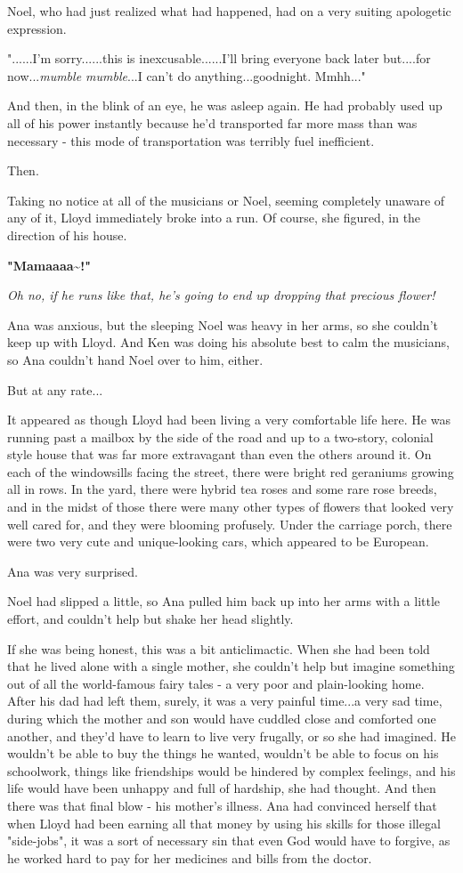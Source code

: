 \documentclass[
]{article}
\begin{document}
Noel, who had just realized what had happened, had on a very suiting
apologetic expression.

"......I'm sorry......this is inexcusable......I'll bring everyone back
later but....for now...\emph{mumble mumble}...I can't do
anything...goodnight. Mmhh..."

And then, in the blink of an eye, he was asleep again. He had probably
used up all of his power instantly because he'd transported far more
mass than was necessary - this mode of transportation was terribly fuel
inefficient.

Then.

Taking no notice at all of the musicians or Noel, seeming completely
unaware of any of it, Lloyd immediately broke into a run. Of course, she
figured, in the direction of his house.

\textbf{"Mamaaaa\textasciitilde!"}

\emph{Oh no, if he runs like that, he's going to end up dropping that
precious flower!}

Ana was anxious, but the sleeping Noel was heavy in her arms, so she
couldn't keep up with Lloyd. And Ken was doing his absolute best to calm
the musicians, so Ana couldn't hand Noel over to him, either.

But at any rate...

It appeared as though Lloyd had been living a very comfortable life
here. He was running past a mailbox by the side of the road and up to a
two-story, colonial style house that was far more extravagant than even
the others around it. On each of the windowsills facing the street,
there were bright red geraniums growing all in rows. In the yard, there
were hybrid tea roses and some rare rose breeds, and in the midst of
those there were many other types of flowers that looked very well cared
for, and they were blooming profusely. Under the carriage porch, there
were two very cute and unique-looking cars, which appeared to be
European.

Ana was very surprised.

Noel had slipped a little, so Ana pulled him back up into her arms with
a little effort, and couldn't help but shake her head slightly.

If she was being honest, this was a bit anticlimactic. When she had been
told that he lived alone with a single mother, she couldn't help but
imagine something out of all the world-famous fairy tales - a very poor
and plain-looking home. After his dad had left them, surely, it was a
very painful time...a very sad time, during which the mother and son
would have cuddled close and comforted one another, and they'd have to
learn to live very frugally, or so she had imagined. He wouldn't be able
to buy the things he wanted, wouldn't be able to focus on his
schoolwork, things like friendships would be hindered by complex
feelings, and his life would have been unhappy and full of hardship, she
had thought. And then there was that final blow - his mother's illness.
Ana had convinced herself that when Lloyd had been earning all that
money by using his skills for those illegal "side-jobs", it was a sort
of necessary sin that even God would have to forgive, as he worked hard
to pay for her medicines and bills from the doctor.
\end{document}
